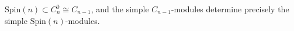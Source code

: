 $\text{Spin}(n) \subset C_n^0 \cong C_{n-1}$, and the simple $C_{n-1}$-modules determine precisely the simple $\text{Spin}(n)$-modules.
